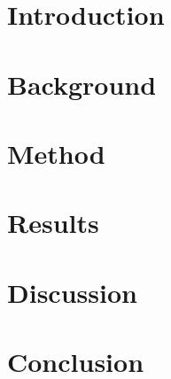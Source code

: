 \documentclass{article}
\begin{document}
\section{Introduction}
\section{Background}
\section{Method}
\section{Results}
\section{Discussion}
\section{Conclusion}
\end{document}
